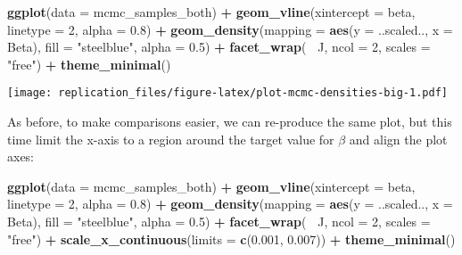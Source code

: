 \documentclass[]{article}
\newenvironment{Shaded}{\begin{snugshade}}{\end{snugshade}}
\newcommand{\KeywordTok}[1]{\textcolor[rgb]{0.13,0.29,0.53}{\textbf{#1}}}
\newcommand{\DataTypeTok}[1]{\textcolor[rgb]{0.13,0.29,0.53}{#1}}
\newcommand{\DecValTok}[1]{\textcolor[rgb]{0.00,0.00,0.81}{#1}}
\newcommand{\FloatTok}[1]{\textcolor[rgb]{0.00,0.00,0.81}{#1}}
\newcommand{\StringTok}[1]{\textcolor[rgb]{0.31,0.60,0.02}{#1}}
\newcommand{\OperatorTok}[1]{\textcolor[rgb]{0.81,0.36,0.00}{\textbf{#1}}}
\newcommand{\NormalTok}[1]{#1}
\begin{document}
\begin{Shaded}
\begin{Highlighting}[]
\KeywordTok{ggplot}\NormalTok{(}\DataTypeTok{data =}\NormalTok{ mcmc_samples_both) }\OperatorTok{+}
\StringTok{    }\KeywordTok{geom_vline}\NormalTok{(}\DataTypeTok{xintercept =}\NormalTok{ beta,}
                \DataTypeTok{linetype =} \DecValTok{2}\NormalTok{,}
                \DataTypeTok{alpha =} \FloatTok{0.8}\NormalTok{) }\OperatorTok{+}
\StringTok{    }\KeywordTok{geom_density}\NormalTok{(}\DataTypeTok{mapping =} \KeywordTok{aes}\NormalTok{(}\DataTypeTok{y =}\NormalTok{ ..scaled.., }\DataTypeTok{x =}\NormalTok{ Beta),}
                \DataTypeTok{fill =} \StringTok{"steelblue"}\NormalTok{,}
                \DataTypeTok{alpha =} \FloatTok{0.5}\NormalTok{) }\OperatorTok{+}
\StringTok{    }\KeywordTok{facet_wrap}\NormalTok{(}\OperatorTok{~}\StringTok{ }\NormalTok{J, }\DataTypeTok{ncol =} \DecValTok{2}\NormalTok{, }\DataTypeTok{scales =} \StringTok{"free"}\NormalTok{) }\OperatorTok{+}
\StringTok{    }\KeywordTok{theme_minimal}\NormalTok{()}
\end{Highlighting}
\end{Shaded}

\texttt{[image: replication\_files/figure-latex/plot-mcmc-densities-big-1.pdf]}

As before, to make comparisons easier, we can re-produce the same plot,
but this time limit the x-axis to a region around the target value for
\(\beta\) and align the plot axes:

\begin{Shaded}
\begin{Highlighting}[]
\KeywordTok{ggplot}\NormalTok{(}\DataTypeTok{data =}\NormalTok{ mcmc_samples_both) }\OperatorTok{+}
\StringTok{    }\KeywordTok{geom_vline}\NormalTok{(}\DataTypeTok{xintercept =}\NormalTok{ beta,}
                \DataTypeTok{linetype =} \DecValTok{2}\NormalTok{,}
                \DataTypeTok{alpha =} \FloatTok{0.8}\NormalTok{) }\OperatorTok{+}
\StringTok{    }\KeywordTok{geom_density}\NormalTok{(}\DataTypeTok{mapping =} \KeywordTok{aes}\NormalTok{(}\DataTypeTok{y =}\NormalTok{ ..scaled.., }\DataTypeTok{x =}\NormalTok{ Beta),}
                \DataTypeTok{fill =} \StringTok{"steelblue"}\NormalTok{,}
                \DataTypeTok{alpha =} \FloatTok{0.5}\NormalTok{) }\OperatorTok{+}
\StringTok{    }\KeywordTok{facet_wrap}\NormalTok{(}\OperatorTok{~}\StringTok{ }\NormalTok{J, }\DataTypeTok{ncol =} \DecValTok{2}\NormalTok{, }\DataTypeTok{scales =} \StringTok{"free"}\NormalTok{) }\OperatorTok{+}
\StringTok{    }\KeywordTok{scale_x_continuous}\NormalTok{(}\DataTypeTok{limits =} \KeywordTok{c}\NormalTok{(}\FloatTok{0.001}\NormalTok{, }\FloatTok{0.007}\NormalTok{)) }\OperatorTok{+}
\StringTok{    }\KeywordTok{theme_minimal}\NormalTok{()}
\end{Highlighting}
\end{Shaded}
\end{document}
